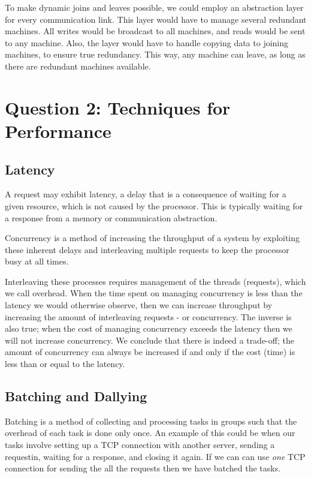 \documentclass[11pt]{article}
\begin{document}
To make dynamic joins and leaves possible, we could employ an abstraction layer
for every communication link. This layer would have to manage several redundant
machines. All writes would be broadcast to all machines, and reads would be sent
to any machine. Also, the layer would have to handle copying data to joining
machines, to ensure true redundancy. 
This way, any machine can leave, as long as there are redundant machines available.

\section*{Question 2: Techniques for Performance}

\subsection*{Latency}

A request may exhibit latency, a delay that is a consequence of waiting for
a given resource, which is not caused by the processor. This is typically
waiting for a response from a memory or communication abstraction.

Concurrency is a method of increasing the throughput of a system by exploiting
these inherent delays and interleaving multiple requests to keep the processor
busy at all times.

Interleaving these processes requires management of the threads (requests),
which we call overhead. When the time spent on managing concurrency is less
than the latency we would otherwise observe, then we can increase throughput
by increasing the amount of interleaving requests - or concurrency. The inverse
is also true; when the cost of managing concurrency exceeds the latency then
we will not increase concurrency. We conclude that there is indeed a trade-off;
the amount of concurrency can always be increased if and only if the cost (time)
is less than or equal to the latency.

\subsection*{Batching and Dallying}

Batching is a method of collecting and processing tasks in groups such that
the overhead of each task is done only once.
An example of this could be when our tasks involve setting up a TCP connection
with another server, sending a requestin, waiting for a response, and closing
it again. If we can can use \emph{one} TCP connection for sending the all the
requests then we have batched the tasks.
\end{document}

